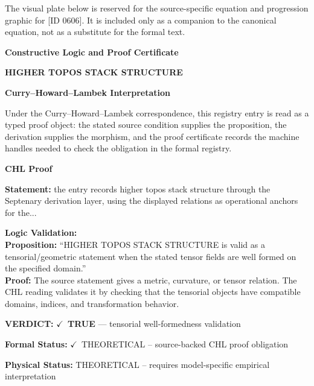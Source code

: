 \begingroup\footnotesize\sloppy
The visual plate below is reserved for the source-specific equation and progression graphic for [ID 0606]. It is included only as a companion to the canonical equation, not as a substitute for the formal text.
\par\endgroup
\ifTZPDarkEdition
{}
\fi

\clearpage
\begingroup\tzpsupportsetup
\noindent\textbf{\fontsize{10.8pt}{12.8pt}\selectfont [ID 0606] Constructive Logic and Proof Certificate}\par
\noindent\textbf{\fontsize{10pt}{12pt}\selectfont HIGHER TOPOS STACK STRUCTURE}\par
\vspace{0.45em}
\begingroup
\footnotesize
\setlength{\parskip}{0.22em}
\setlength{\parindent}{0pt}
\noindent\textbf{Curry--Howard--Lambek Interpretation}\par
Under the Curry--Howard--Lambek correspondence, this registry entry is read as a typed proof
object: the stated source condition supplies the proposition, the derivation supplies the
morphism, and the proof certificate records the machine handles needed to check the obligation
in the formal registry.

\vspace{0.45em}
\noindent\textbf{CHL Proof}\par
\textbf{Statement:} the entry records higher topos stack structure through the Septenary derivation layer,
using the displayed relations as operational anchors for the...

\textbf{Logic Validation:}\\
\textbf{Proposition:} ``HIGHER TOPOS STACK STRUCTURE is valid as a tensorial/geometric statement when the stated
tensor fields are well formed on the specified domain.''\\
\textbf{Proof:} The source statement gives a metric, curvature, or tensor relation. The CHL reading
validates it by checking that the tensorial objects have compatible domains, indices,
and transformation behavior.

\textbf{VERDICT:} \ensuremath{\checkmark}\ \textbf{TRUE} --- tensorial well-formedness validation

\textbf{Formal Status:} \ensuremath{\checkmark}\ THEORETICAL -- source-backed CHL proof obligation

\textbf{Physical Status:} THEORETICAL -- requires model-specific empirical interpretation
\par\vspace{0.45em}
\par
\ifTZPDarkEdition
{}
\fi
\endgroup
\endgroup

